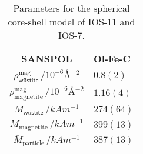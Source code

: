 \documentclass[\main/dresen_thesis.tex]{subfiles}
\begin{document}
    \begin{table}[!htbp]
      \centering
      \caption{\label{tab:colloidalCrystals:nanoparticle:sanspol}Parameters for the spherical core-shell model of IOS-11 and IOS-7.}
      \begin{tabular}{ c | l }
        \rule{0pt}{2ex} \textbf{SANSPOL}  & \textbf{Ol-Fe-C} \\
        \hline
        \rule{0pt}{2ex} $\rho^\mathrm{mag}_\textsf{w\"ustite} \, / \unit{10^{-6} \angstrom^{-2}}$ & $0.8(2)$ \\
        \rule{0pt}{2ex} $\rho^\mathrm{mag}_\mathrm{magnetite} \, / \unit{10^{-6} \angstrom^{-2}}$ & $1.16(4)$ \\
        \hline
        \rule{0pt}{2ex} $M_\textsf{w\"ustite} \, / \unit{kA m^{-1}}$      & $274(64)$ \\
        \rule{0pt}{2ex} $M_\mathrm{magnetite} \, / \unit{kA m^{-1}}$      & $399(13)$ \\
        \hline
        \rule{0pt}{2ex} $\bar{M}_\mathrm{particle} \, / \unit{kA m^{-1}}$ & $387(13)$ \\
        \hline
      \end{tabular}
    \end{table}
\end{document}
